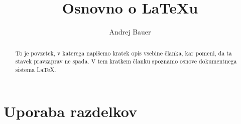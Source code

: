 \documentclass[a4paper]{article}
\begin{document}
 


\title{Osnovno o {\LaTeX}u}
\author{Andrej Bauer}



\maketitle

%
%

\begin{abstract}
  To je povzetek, v katerega napišemo kratek opis vsebine članka, kar pomeni, da ta stavek
  pravzaprav ne spada. V tem kratkem članku spoznamo osnove dokumentnega sistema {\LaTeX}.
\end{abstract}


\section{Uporaba razdelkov}
\end{document}
